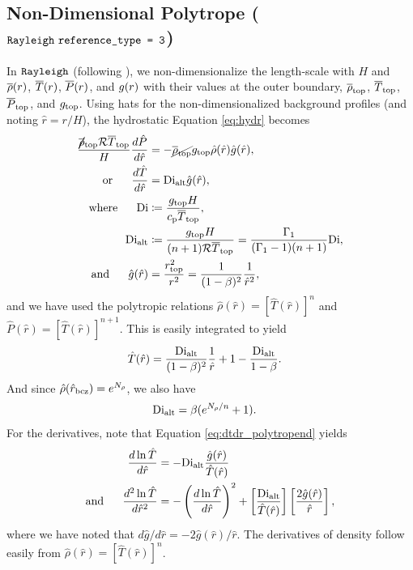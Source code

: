\documentclass[12pt]{article}
\numberwithin{equation}{section}
\newcommand{\dialt}{\di_{\rm{alt}}}
\begin{document}
\subsection{Non-Dimensional Polytrope ($\texttt{Rayleigh}\ \texttt{reference\_type = 3}$)} 
In $\texttt{Rayleigh}$ (following \citealt{Heimpel2022}), we non-dimensionalize the length-scale with $H$ and $\overline{\rho}(r)$, $\overline{T}(r)$, $\overline{P}(r)$, and $g(r)$ with their values at the outer boundary, $\overline{\rho}_{\rm{top}}$, $\overline{T}_{\rm{top}}$, $\overline{P}_{\rm{top}}$, and $g_{\rm{top}}$. Using hats for the non-dimensionalized background profiles (and noting $\hat{r}=r/H$), the hydrostatic Equation \eqref{eq:hydr} becomes
\begin{subequations}
\begin{align}
	\frac{\cancel{\rhoref}\topp\gasconst\tmpref\topp}{H}\frac{d\hat{P}}{d\hat{r}} &= -\cancel{\rhoref\topp}g\topp\hat{\rho}(\hat{r})\hat{g}(\hat{r}),\\
	\orr \frac{d\hat{T}}{d\hat{r}} &= \dialt\hat{g}(\hat{r})\label{eq:dtdr_polytropend},\\
	\where \di &\define \frac{g\topp H}{\cp\tmpref\topp},\\
	\dialt &\define \frac{g\topp H}{(n+1)\gasconst \tmpref\topp} = \frac{\gammaone}{(\gammaone-1)(n+1)}\di,\\
	\andd \hat{g}(\hat{r}) &= \frac{r\topp^2}{r^2} = \frac{1}{(1-\beta)^2}\frac{1}{\hat{r}^2},
\end{align}
\end{subequations}
and we have used the polytropic relations $\hat{\rho}(\hat{r})=[\hat{T}(\hat{r})]^n$ and $\hat{P}(\hat{r})=[\hat{T}(\hat{r})]^{n+1}$. This is easily integrated to yield
\begin{align}
	\hat{T}(\hat{r}) &= \frac{\dialt}{(1-\beta)^2}\frac{1}{\hat{r}} + 1 - \frac{\dialt}{1-\beta}.
\end{align}
And since $\hat{\rho}(\hat{r}_{\rm{bcz}}) = e^{N_\rho}$, we also have 
\begin{align}
	\dialt &= \beta (e^{N_\rho/n} + 1). 
\end{align}
For the derivatives, note that Equation \eqref{eq:dtdr_polytropend} yields
\begin{align}
	\frac{d\ln\hat{T}}{d\hat{r}} &= -\dialt \frac{\hat{g}(\hat{r})}{\hat{T}(\hat{r})}\\
	\andd \frac{d^2\ln\hat{T}}{d\hat{r}^2} &= -\left(\frac{d\ln\hat{T}}{d\hat{r}}\right)^2 + \left[\frac{\dialt}{\hat{T}(\hat{r})}\right] \left[\frac{2\hat{g}(\hat{r})}{\hat{r}} \right],
\end{align}
where we have noted that $d\hat{g}/d\hat{r}=-2\hat{g}(\hat{r})/\hat{r}$. The derivatives of density follow easily from $\hat{\rho}(\hat{r})=[\hat{T}(\hat{r})]^n$.
\end{document}
